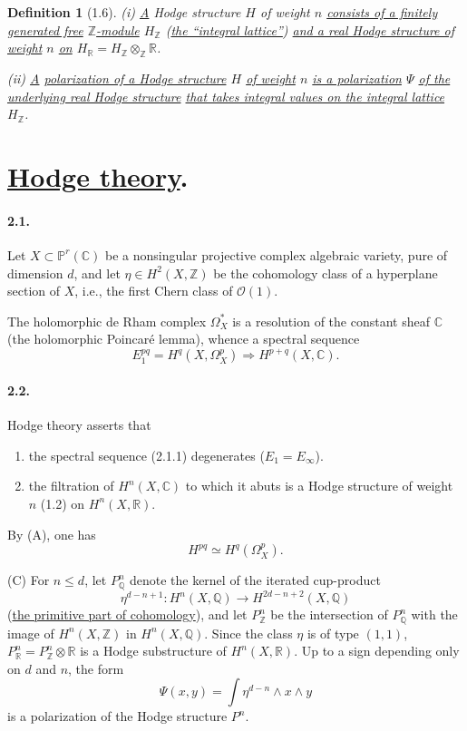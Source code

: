 \documentclass[10pt,leqno]{article}
\newcommand{\C}{\mathbb C}
\newcommand{\R}{\mathbb R}
\newcommand{\Z}{\mathbb Z}
\newcommand{\Q}{\mathbb Q}
\newcommand{\Pj}{\mathbb P}
\newcommand{\cO}{\mathcal O}
\theoremstyle{deligne}
\newtheorem*{definition}{Definition}
\renewcommand{\underline}[1]{\uline{#1}}
\begin{document}
\begin{definition}[1.6]
(i) \underline{A} Hodge structure $H$ of weight $n$ \underline{consists of a finitely generated free} $\Z$\underline{-module} $H_\Z$ (\underline{the ``integral lattice''}) \underline{and a real Hodge structure of weight} $n$ \underline{on} $H_\R=H_\Z\otimes_\Z\R$.

(ii) \underline{A} \underline{polarization of a Hodge structure} $H$ \underline{of weight} $n$ \underline{is a polarization} $\Psi$ \underline{of the underlying real Hodge structure} \underline{that takes integral values on the integral lattice} $H_\Z$.
\end{definition}

\section{\underline{Hodge theory}.}

\paragraph{2.1.}
Let $X\subset\Pj^r(\C)$ be a nonsingular projective complex algebraic variety, pure of dimension $d$, and let $\eta\in H^2(X,\Z)$ be the cohomology class of a hyperplane section of $X$, i.e., the first Chern class of $\cO(1)$.

The holomorphic de Rham complex $\Omega_X^*$ is a resolution of the constant sheaf $\C$ (the holomorphic Poincaré lemma), whence a spectral sequence
\begin{equation}
E_1^{pq}=H^q(X,\Omega_X^p)\Rightarrow H^{p+q}(X,\C).
\tag{2.1.1}
\end{equation}

\paragraph{2.2.}
Hodge theory asserts that
\begin{enumerate}[label=(\Alph*)]
\item the spectral sequence (2.1.1) degenerates ($E_1=E_\infty$).
\item the filtration of $H^n(X,\C)$ to which it abuts is a Hodge structure of weight $n$ (1.2) on $H^n(X,\R)$.
\end{enumerate}
By (A), one has
\[
H^{pq}\simeq H^q(\Omega_X^p).
\]

(C) For $n\le d$, let $P_\Q^n$ denote the kernel of the iterated cup-product
\[
\eta^{d-n+1}:H^n(X,\Q)\longrightarrow H^{2d-n+2}(X,\Q)
\]
(\underline{the primitive part of cohomology}), and let $P_\Z^n$ be the intersection of $P_\Q^n$ with the image of $H^n(X,\Z)$ in $H^n(X,\Q)$. Since the class $\eta$ is of type $(1,1)$, $P_\R^n=P_\Z^n\otimes\R$ is a Hodge substructure of $H^n(X,\R)$. Up to a sign depending only on $d$ and $n$, the form
\[
\Psi(x,y)=\int \eta^{d-n}\wedge x\wedge y
\]
is a polarization of the Hodge structure $P^n$.
\end{document}
